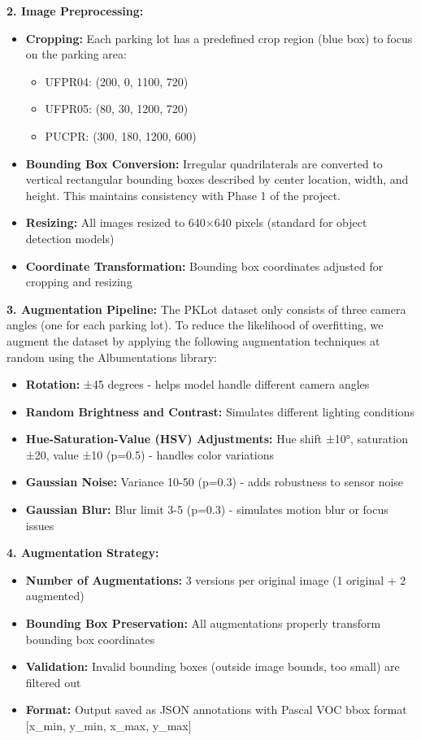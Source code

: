 \documentclass[12pt,a4paper]{article}
\begin{document}
\textbf{2. Image Preprocessing:}
\begin{itemize}
    \item \textbf{Cropping:} Each parking lot has a predefined crop region (blue box) to focus on the parking area:
    \begin{itemize}
        \item UFPR04: (200, 0, 1100, 720)
        \item UFPR05: (80, 30, 1200, 720)
        \item PUCPR: (300, 180, 1200, 600)
    \end{itemize}
    \item \textbf{Bounding Box Conversion:} Irregular quadrilaterals are converted to vertical rectangular bounding boxes described by center location, width, and height. This maintains consistency with Phase 1 of the project.
    \item \textbf{Resizing:} All images resized to 640×640 pixels (standard for object detection models)
    \item \textbf{Coordinate Transformation:} Bounding box coordinates adjusted for cropping and resizing
\end{itemize}

\textbf{3. Augmentation Pipeline:}
The PKLot dataset only consists of three camera angles (one for each parking lot). To reduce the likelihood of overfitting, we augment the dataset by applying the following augmentation techniques at random using the Albumentations library:

\begin{itemize}
    \item \textbf{Rotation:} ±45 degrees - helps model handle different camera angles
    \item \textbf{Random Brightness and Contrast:} Simulates different lighting conditions
    \item \textbf{Hue-Saturation-Value (HSV) Adjustments:} Hue shift ±10°, saturation ±20, value ±10 (p=0.5) - handles color variations
    \item \textbf{Gaussian Noise:} Variance 10-50 (p=0.3) - adds robustness to sensor noise
    \item \textbf{Gaussian Blur:} Blur limit 3-5 (p=0.3) - simulates motion blur or focus issues
\end{itemize}

\textbf{4. Augmentation Strategy:}
\begin{itemize}
    \item \textbf{Number of Augmentations:} 3 versions per original image (1 original + 2 augmented)
    \item \textbf{Bounding Box Preservation:} All augmentations properly transform bounding box coordinates
    \item \textbf{Validation:} Invalid bounding boxes (outside image bounds, too small) are filtered out
    \item \textbf{Format:} Output saved as JSON annotations with Pascal VOC bbox format [x\_min, y\_min, x\_max, y\_max]
\end{itemize}
\end{document}
